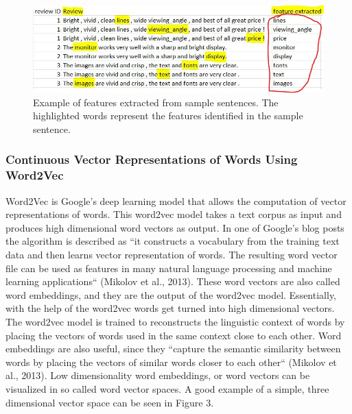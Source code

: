 \documentclass{sig-alternate}
\begin{document}
\begin{figure}
\centering
\includegraphics[scale=0.60]{images/feature_extraction.JPG}
\caption{Example of features extracted from sample sentences. The highlighted words represent the features identified in the sample sentence.}
\end{figure}

\subsubsection{Continuous Vector Representations of Words Using Word2Vec}
Word2Vec is Google's deep learning model that allows the computation of vector representations of words. This word2vec model takes a text corpus as input and produces high dimensional word vectors as output. In one of Google's blog posts the algorithm is described as ``it constructs a vocabulary from the training text data and then learns vector representation of words. The resulting word vector file can be used as features in many natural language processing and machine learning applications``  (Mikolov et al., 2013). 
These word vectors are also called word embeddings, and they are the output of the word2vec model. Essentially, with the help of the word2vec words get turned into high dimensional vectors. The word2vec model is trained to reconstructs the linguistic context of words by placing the vectors of words used in the same context close to each other. Word embeddings are also useful, since they ``capture the semantic similarity between words by placing the vectors of similar words closer to each other``  (Mikolov et al., 2013). Low dimensionality word embeddings, or word vectors can be visualized in so called word vector spaces. A good example of a simple, three dimensional vector space can be seen in Figure 3.
\end{document}
